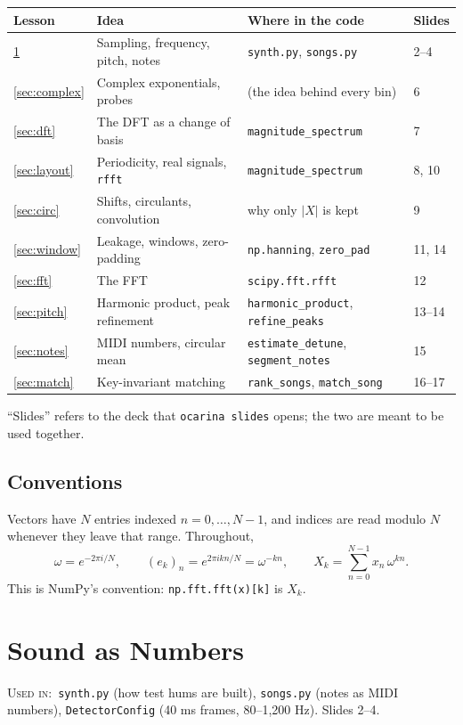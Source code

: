 \documentclass[11pt]{article}
\theoremstyle{definition}
\newcommand{\abs}[1]{\lvert #1\rvert}
\newcommand{\code}[1]{\texttt{#1}}
\newcommand{\usedin}[1]{\par\noindent\colorbox{black!8}{\parbox{\dimexpr\linewidth-2\fboxsep\relax}{\small\textsc{Used in:}~#1}}\par\medskip}
\begin{document}
\begin{center}
\small
\begin{tabular}{@{}l l l l@{}}
\toprule
Lesson & Idea & Where in the code & Slides\\
\midrule
\ref{sec:sound} & Sampling, frequency, pitch, notes & \code{synth.py}, \code{songs.py} & 2--4\\
\ref{sec:complex} & Complex exponentials, probes & (the idea behind every bin) & 6\\
\ref{sec:dft} & The DFT as a change of basis & \code{magnitude\_spectrum} & 7\\
\ref{sec:layout} & Periodicity, real signals, \code{rfft} & \code{magnitude\_spectrum} & 8, 10\\
\ref{sec:circ} & Shifts, circulants, convolution & why only $\abs{X}$ is kept & 9\\
\ref{sec:window} & Leakage, windows, zero-padding & \code{np.hanning}, \code{zero\_pad} & 11, 14\\
\ref{sec:fft} & The FFT & \code{scipy.fft.rfft} & 12\\
\ref{sec:pitch} & Harmonic product, peak refinement & \code{harmonic\_product}, \code{refine\_peaks} & 13--14\\
\ref{sec:notes} & MIDI numbers, circular mean & \code{estimate\_detune}, \code{segment\_notes} & 15\\
\ref{sec:match} & Key-invariant matching & \code{rank\_songs}, \code{match\_song} & 16--17\\
\bottomrule
\end{tabular}
\end{center}

\noindent ``Slides'' refers to the deck that \code{ocarina slides} opens; the two are
meant to be used together.

\subsection*{Conventions}

Vectors have $N$ entries indexed $n=0,\dots,N-1$, and indices are read modulo $N$
whenever they leave that range. Throughout,
\[
\omega = e^{-2\pi i/N},\qquad (e_k)_n = e^{2\pi i kn/N}=\omega^{-kn},\qquad
X_k=\sum_{n=0}^{N-1}x_n\,\omega^{kn}.
\]
This is NumPy's convention: \code{np.fft.fft(x)[k]} is $X_k$.

\tableofcontents
\clearpage

\section{Sound as Numbers}\label{sec:sound}
\usedin{\code{synth.py} (how test hums are built), \code{songs.py} (notes as MIDI
numbers), \code{DetectorConfig} (40 ms frames, 80--1{,}200 Hz). Slides 2--4.}
\end{document}
